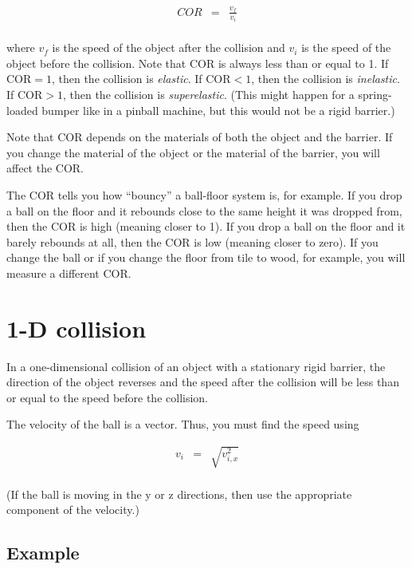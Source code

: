 \begin{eqnarray*}
	COR & = & \frac{v_f}{v_i} \\
\end{eqnarray*}

where $v_f$ is the speed of the object after the collision and $v_i$ is the speed of the object before the collision. Note that COR is always less than or equal to 1. If COR$=1$, then the collision is \emph{elastic}. If COR$<1$, then the collision is \emph{inelastic}. If COR$>1$, then the collision is \emph{superelastic}. (This might happen for a spring-loaded bumper like in a pinball machine, but this would not be a rigid barrier.)

Note that COR depends on the materials of both the object and the barrier. If you change the material of the object or the material of the barrier, you will affect the COR.

The COR tells you how ``bouncy'' a ball-floor system is, for example. If you drop a ball on the floor and it rebounds close to the same height it was dropped from, then the COR is high (meaning closer to 1). If you drop a ball on the floor and it barely rebounds at all, then the COR is low (meaning closer to zero). If you change the ball or if you change the floor from tile to wood, for example, you will measure a different COR.

\section*{1-D collision}

In a one-dimensional collision of an object with a stationary rigid barrier, the direction of the object reverses and the speed after the collision will be less than or equal to the speed before the collision.


The velocity of the ball is a vector. Thus, you must find the speed using

\begin{eqnarray*}
	v_i & = & \sqrt{v_{i,x}^2} \\
\end{eqnarray*}

(If the ball is moving in the y or z directions, then use the appropriate component of the velocity.)

\subsection*{Example}

